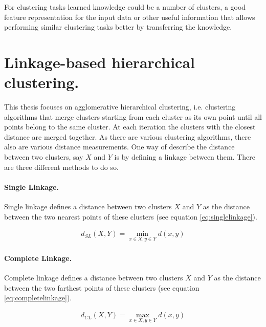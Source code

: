 For clustering tasks learned knowledge could be a number of clusters, a good feature representation for the input data or other useful information that allows performing similar clustering tasks better by transferring the knowledge.

\section{Linkage-based hierarchical clustering.}

This thesis focuses on agglomerative hierarchical clustering, i.e. clustering algorithms that merge clusters starting from each cluster as its own point until all points belong to the same cluster. At each iteration the clusters with the closest distance are merged together. As there are various clustering algorithms, there also are various distance measurements. One way of describe the distance between two clusters, say $X$ and $Y$ is by defining a linkage between them. There are three different methods to do so.

\paragraph{Single Linkage.}

Single linkage defines a distance between two clusters $X$ and $Y$ as the distance between the two nearest points of these clusters (see equation \ref{eq:singlelinkage}).

\begin{equation}
    \begin{aligned}
        d_{SL}(X,Y) = \min\limits_{x \in X, y \in Y} d(x,y)
    \end{aligned}
    \label{eq:singlelinkage}
\end{equation}

\paragraph{Complete Linkage.}

Complete linkage defines a distance between two clusters $X$ and $Y$ as the distance between the two farthest points of these clusters (see equation \ref{eq:completelinkage}).

\begin{equation}
    \begin{aligned}
        d_{CL}(X,Y) = \max\limits_{x \in X, y \in Y} d(x,y)
    \end{aligned}
    \label{eq:completelinkage}
\end{equation}

